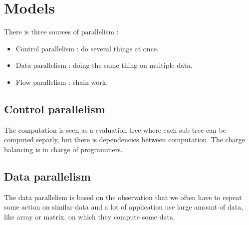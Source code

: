 \documentclass[11pt,a4paper]{report}
\begin{document}


\chapter{Models} %
\label{cha:Models}

There is three sources of parallelism :
\begin{itemize}
    \item Control parallelism : do several things at once.
    \item Data parallelism : doing the same thing on multiple data.
    \item Flow parallelism : chain work.
\end{itemize}

\section{Control parallelism} %
\label{sec:Control parallelism}

\begin{center}
\end{center}

The computation is seen as a evaluation tree where each sub-tree can be computed separly, but there is dependencies between computation. The charge balancing is in charge of programmers.


\section{Data parallelism} %
\label{sec:Data parallelism}

The data parallelism is based on the observation that we often have to repeat some action on similar data and a lot of application use large amount of data, like array or matrix, on which they compute some data.
\end{document}
